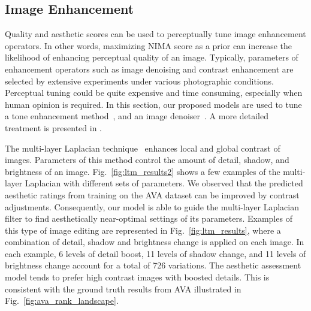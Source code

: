 \documentclass[10pt,twocolumn,twoside]{IEEEtran}
\begin{document}
\subsection{Image Enhancement}
\label{sec:enhancement}
\vspace{0 mm}

Quality and aesthetic scores can be used to perceptually tune image enhancement operators. In other words, maximizing NIMA score as a prior can increase the likelihood of enhancing perceptual quality of an image. Typically, parameters of enhancement operators such as image denoising and contrast enhancement are selected by extensive experiments under various photographic conditions. Perceptual tuning could be quite expensive and time consuming, especially when human opinion is required. In this section, our proposed models are used to tune a tone enhancement method~\cite{talebi2016fast}, and an image denoiser~\cite{wong2016turbo}. A more detailed treatment is presented in \cite{talebi2017learned}.

The multi-layer Laplacian technique~\cite{talebi2016fast} enhances local and global contrast of images. Parameters of this method control the amount of detail, shadow, and brightness of an image. Fig.~\ref{fig:ltm_results2} shows a few examples of the multi-layer Laplacian with different sets of parameters. We observed that the predicted aesthetic ratings from training on the AVA dataset can be improved by contrast adjustments. Consequently, our model is able to guide the multi-layer Laplacian filter to find aesthetically near-optimal settings of its parameters. Examples of this type of image editing are represented in Fig.~\ref{fig:ltm_results}, where a combination of detail, shadow and brightness change is applied on each image. In each example, 6 levels of detail boost, 11 levels of shadow change, and 11 levels of brightness change account for a total of 726 variations. The aesthetic assessment model tends to prefer high contrast images with boosted details. This is consistent with the ground truth results from AVA illustrated in Fig.~\ref{fig:ava_rank_landscape}.
\end{document}
